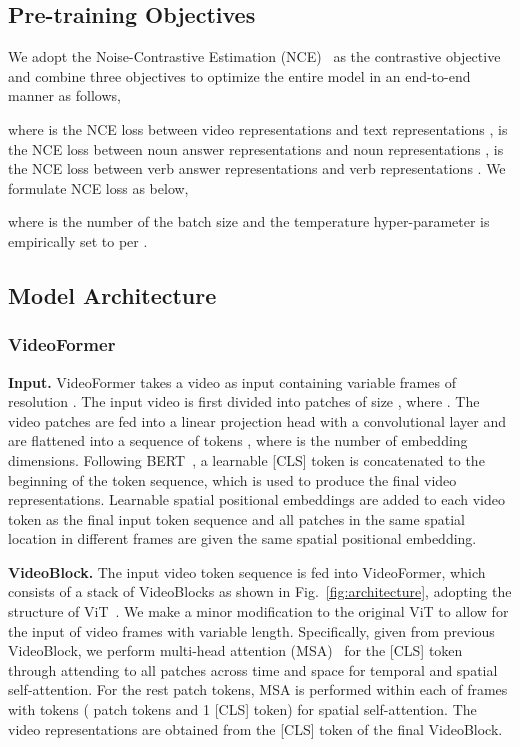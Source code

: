 \documentclass[10pt,twocolumn,letterpaper]{article}
\begin{document}
\subsection{Pre-training Objectives}\label{sec:strategy}
 We adopt the Noise-Contrastive Estimation (NCE)~\cite{contrastive1,contrastive2} as the contrastive objective and combine three objectives to optimize the entire model in an end-to-end manner as follows,
\begin{small}

\end{small}
where  is the NCE loss between video representations  and text representations ,  is the NCE loss between noun answer representations  and noun representations ,  is the NCE loss between verb answer representations  and verb representations . We formulate NCE loss as below,
	\begin{small}
		
	\end{small}
where  is the number of the batch size and the temperature hyper-parameter  is empirically set to  per \cite{frozen}.


\subsection{Model Architecture}\label{sec:architecture}
\subsubsection{VideoFormer}
{\flushleft \bf Input.} VideoFormer takes a video  as input containing variable  frames of resolution . The input video is first divided into  patches of size , where . The video patches  are fed into a linear projection head with a convolutional layer and are flattened into a sequence of tokens , where  is the number of embedding dimensions. Following BERT~\cite{bert}, a learnable [CLS] token is concatenated to the beginning of the token sequence, which is used to produce the final video representations. Learnable spatial positional embeddings  are added to each video token as the final input token sequence   and all patches in the same spatial location in different frames are given the same spatial positional embedding.

{\flushleft \bf VideoBlock.} The input video token sequence  is fed into VideoFormer, which consists of a stack of VideoBlocks as shown in Fig.~\ref{fig:architecture}, adopting the structure of ViT~\cite{vit}. We make a minor modification to the original ViT to allow for the input of video frames with variable length. Specifically, given  from previous VideoBlock, we perform multi-head attention (MSA)~\cite{vit} for the [CLS] token through attending to all  patches across time and space for temporal and spatial self-attention. For the rest  patch tokens, MSA is performed within each of  frames with  tokens ( patch tokens and 1 [CLS] token) for spatial self-attention. The video representations are obtained from the [CLS] token of the final VideoBlock.
\end{document}
